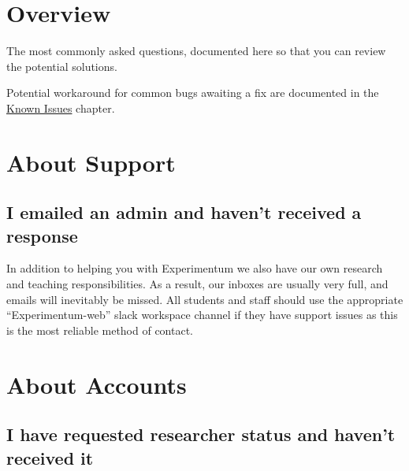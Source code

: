 \documentclass[]{book}
\begin{document}
\hypertarget{overview-8}{%
\section*{Overview}\label{overview-8}}

The most commonly asked questions, documented here so that you can review the potential solutions.

Potential workaround for common bugs awaiting a fix are documented in the \protect\hyperlink{knownissues}{Known Issues} chapter.

\hypertarget{about-support}{%
\section*{About Support}\label{about-support}}

\hypertarget{i-emailed-an-admin-and-havent-received-a-response}{%
\subsection*{I emailed an admin and haven't received a response}\label{i-emailed-an-admin-and-havent-received-a-response}}

In addition to helping you with Experimentum we also have our own research and teaching responsibilities. As a result, our inboxes are usually very full, and emails will inevitably be missed. All students and staff should use the appropriate ``Experimentum-web'' slack workspace channel if they have support issues as this is the most reliable method of contact.

\hypertarget{about-accounts}{%
\section*{About Accounts}\label{about-accounts}}

\hypertarget{i-have-requested-researcher-status-and-havent-received-it}{%
\subsection*{I have requested researcher status and haven't received it}\label{i-have-requested-researcher-status-and-havent-received-it}}
\end{document}
